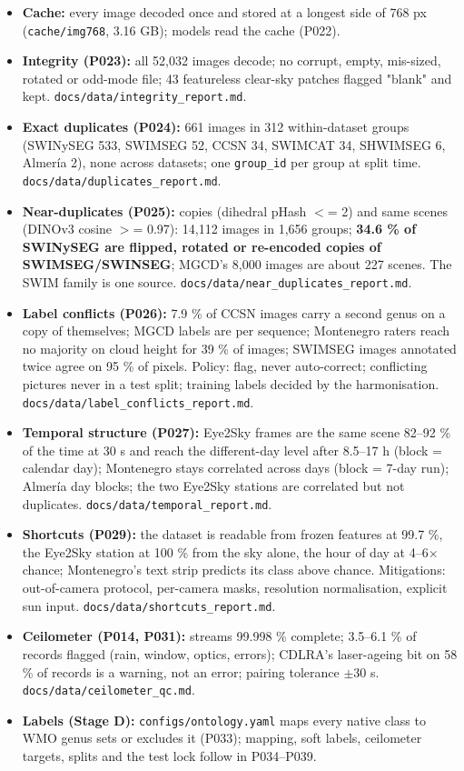 \begin{itemize}
\item \textbf{Cache:} every image decoded once and stored at a longest side of 768 px (\texttt{cache/img768}, 3.16 GB); models read the cache (P022).
\item \textbf{Integrity (P023):} all 52,032 images decode; no corrupt, empty, mis-sized, rotated or odd-mode file; 43 featureless clear-sky patches flagged "blank" and kept. \texttt{docs/data/integrity\_\allowbreak{}report.md}.
\item \textbf{Exact duplicates (P024):} 661 images in 312 within-dataset groups (SWINySEG 533, SWIMSEG 52, CCSN 34, SWIMCAT 34, SHWIMSEG 6, Almería 2), none across datasets; one \texttt{group\_\allowbreak{}id} per group at split time. \texttt{docs/data/duplicates\_\allowbreak{}report.md}.
\item \textbf{Near-duplicates (P025):} copies (dihedral pHash $<$= 2) and same scenes (DINOv3 cosine $>$= 0.97): 14,112 images in 1,656 groups; \textbf{34.6 \% of SWINySEG are flipped, rotated or re-encoded copies of SWIMSEG/SWINSEG}; MGCD's 8,000 images are about 227 scenes. The SWIM family is one source. \texttt{docs/data/near\_\allowbreak{}duplicates\_\allowbreak{}report.md}.
\item \textbf{Label conflicts (P026):} 7.9 \% of CCSN images carry a second genus on a copy of themselves; MGCD labels are per sequence; Montenegro raters reach no majority on cloud height for 39 \% of images; SWIMSEG images annotated twice agree on 95 \% of pixels. Policy: flag, never auto-correct; conflicting pictures never in a test split; training labels decided by the harmonisation. \texttt{docs/data/label\_\allowbreak{}conflicts\_\allowbreak{}report.md}.
\item \textbf{Temporal structure (P027):} Eye2Sky frames are the same scene 82–92 \% of the time at 30 s and reach the different-day level after 8.5–17 h (block = calendar day); Montenegro stays correlated across days (block = 7-day run); Almería day blocks; the two Eye2Sky stations are correlated but not duplicates. \texttt{docs/data/temporal\_\allowbreak{}report.md}.
\item \textbf{Shortcuts (P029):} the dataset is readable from frozen features at 99.7 \%, the Eye2Sky station at 100 \% from the sky alone, the hour of day at 4–6$\times$ chance; Montenegro's text strip predicts its class above chance. Mitigations: out-of-camera protocol, per-camera masks, resolution normalisation, explicit sun input. \texttt{docs/data/shortcuts\_\allowbreak{}report.md}.
\item \textbf{Ceilometer (P014, P031):} streams 99.998 \% complete; 3.5–6.1 \% of records flagged (rain, window, optics, errors); CDLRA's laser-ageing bit on 58 \% of records is a warning, not an error; pairing tolerance $\pm$30 s. \texttt{docs/data/ceilometer\_\allowbreak{}qc.md}.
\item \textbf{Labels (Stage D):} \texttt{configs/ontology.yaml} maps every native class to WMO genus sets or excludes it (P033); mapping, soft labels, ceilometer targets, splits and the test lock follow in P034–P039.
\end{itemize}

